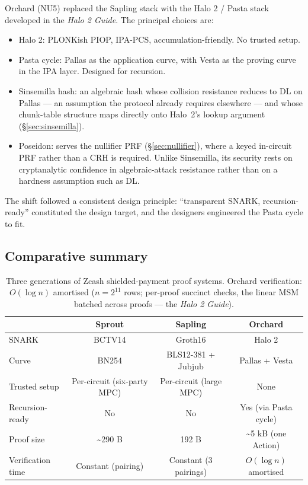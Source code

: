 \documentclass[11pt,a4paper]{article}
\theoremstyle{definition}
\begin{document}
Orchard (NU5) replaced the Sapling stack with the Halo 2 / Pasta stack
developed in the \emph{Halo 2 Guide}. The principal choices are:
\begin{itemize}[leftmargin=*]
\item Halo 2: PLONKish PIOP, IPA-PCS, accumulation-friendly. No trusted
setup.
\item Pasta cycle: Pallas as the application curve, with Vesta as the
proving curve in the IPA layer. Designed for recursion.
\item Sinsemilla hash: an algebraic hash whose collision resistance reduces
to DL on Pallas --- an assumption the protocol already requires elsewhere
--- and whose chunk-table structure maps directly onto Halo~2's lookup
argument (\S\ref{sec:sinsemilla}).
\item Poseidon: serves the nullifier PRF (\S\ref{sec:nullifier}), where a
keyed in-circuit PRF rather than a CRH is required. Unlike Sinsemilla, its
security rests on cryptanalytic confidence in algebraic-attack resistance
rather than on a hardness assumption such as DL.
\end{itemize}

The shift followed a consistent design principle: ``transparent SNARK, recursion-ready''
constituted the design target, and the designers engineered the Pasta cycle to fit.

\subsection{Comparative summary}

\begin{table}[h]\centering\small
\begin{tabular}{@{}lccc@{}}
\toprule
& Sprout & Sapling & Orchard \\
\midrule
SNARK & BCTV14 & Groth16 & Halo 2 \\
Curve & BN254 & BLS12-381 + Jubjub & Pallas + Vesta \\
Trusted setup & Per-circuit (six-party MPC) & Per-circuit (large MPC) & None \\
Recursion-ready & No & No & Yes (via Pasta cycle) \\
Proof size & \textasciitilde 290 B & 192 B & \textasciitilde 5 kB (one Action) \\
Verification time & Constant (pairing) & Constant (3 pairings) & $O(\log n)$ amortised \\
\bottomrule
\end{tabular}
\caption{Three generations of Zcash shielded-payment proof systems.
Orchard verification: $O(\log n)$ amortised ($n = 2^{11}$ rows; per-proof
succinct checks, the linear MSM batched across proofs --- the \emph{Halo 2
Guide}).}\label{tab:zcash-history}
\end{table}
\end{document}
